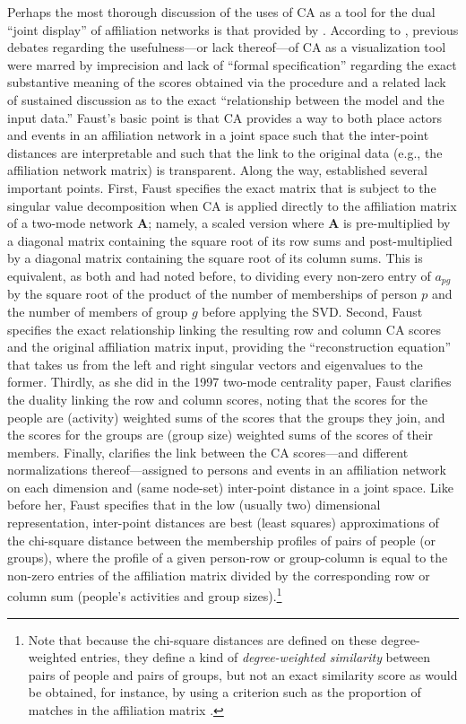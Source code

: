 \documentclass[a4paper,fleqn]{cas-sc}
\begin{document}
Perhaps the most thorough discussion of the uses of CA as a tool for the dual ``joint display'' of affiliation networks is that provided by \citet{faust2005using}. According to \citet[118]{faust2005using}, previous debates regarding the usefulness---or lack thereof---of CA as a visualization tool were marred by imprecision and lack of ``formal specification'' regarding the exact substantive meaning of the scores obtained via the procedure and a related lack of sustained discussion as to the exact ``relationship between the model and the input data.'' Faust's basic point is that CA provides a way to both place actors and events in an affiliation network in a joint space such that the inter-point distances are interpretable and such that the link to the original data (e.g., the affiliation network matrix) is transparent. Along the way, \citet{faust2005using} established several important points. First, Faust specifies the exact matrix that is subject to the singular value decomposition when CA is applied directly to the affiliation matrix of a two-mode network $\mathbf{A}$; namely, a scaled version where $\mathbf{A}$ is pre-multiplied by a diagonal matrix containing the square root of its row sums and post-multiplied by a diagonal matrix containing the square root of its column sums. This is equivalent, as both \citet{faust1997centrality} and \citet{roberts2000correspondence} had noted before, to dividing every non-zero entry of $a_{pg}$ by the square root of the product of the number of memberships of person $p$ and the number of members of group $g$ before applying the SVD. Second, Faust specifies the exact relationship linking the resulting row and column CA scores and the original affiliation matrix input, providing the ``reconstruction equation'' that takes us from the left and right singular vectors and eigenvalues to the former. Thirdly, as she did in the 1997 two-mode centrality paper, Faust clarifies the duality linking the row and column scores, noting that the scores for the people are (activity) weighted sums of the scores that the groups they join, and the scores for the groups are (group size) weighted sums of the scores of their members. Finally, \citet[128ff]{faust2005using} clarifies the link between the CA scores---and different normalizations thereof---assigned to persons and events in an affiliation network on each dimension and (same node-set) inter-point distance in a joint space. Like \citet{roberts2000correspondence} before her, Faust specifies that in the low (usually two) dimensional representation, inter-point distances are best (least squares) approximations of the chi-square distance between the membership profiles of pairs of people (or groups), where the profile of a given person-row or group-column is equal to the non-zero entries of the affiliation matrix divided by the corresponding row or column sum (people's activities and group sizes).\footnote{Note that because the chi-square distances are defined on these degree-weighted entries, they define a kind of \textit{degree-weighted similarity} between pairs of people and pairs of groups, but not an exact similarity score as would be obtained, for instance, by using a criterion such as the proportion of matches in the affiliation matrix \citep[208]{everett2013dual}.}
\end{document}
